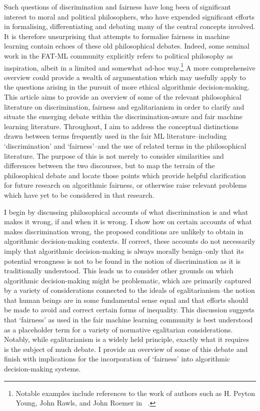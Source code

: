 \documentclass[pmlr,twocolumn,10pt]{jmlr}%
\begin{document}
Such questions of discrimination and fairness have long been of significant interest to moral and political philosophers, who have expended significant efforts in formalising, differentiating and debating many of the central concepts involved. It is therefore unsurprising that attempts to formalise fairness in machine learning contain echoes of these old philosophical debates. Indeed, some seminal work in the FAT-ML community explicitly refers to political philosophy as inspiration, albeit in a limited and somewhat ad-hoc way.\footnote{Notable examples include references to the work of authors such as H. Peyton Young, John Rawls, and John Roemer in ~\cite{dwork2012fairness,joseph2016rawlsian}.} A more comprehensive overview could provide a wealth of argumentation which may usefully apply to the questions arising in the pursuit of more ethical algorithmic decision-making. This article aims to provide an overview of some of the relevant philosophical literature on discrimination, fairness and egalitarianism in order to clarify and situate the emerging debate within the discrimination-aware and fair machine learning literature. Throughout, I aim to address the conceptual distinctions drawn between terms frequently used in the fair ML literature--including `discrimination' and `fairness'--and the use of related terms in the philosophical literature. The purpose of this is not merely to consider similarities and differences between the two discourses, but to map the terrain of the philosophical debate and locate those points which provide helpful clarification for future research on algorithmic fairness, or otherwise raise relevant problems which have yet to be considered in that research.

I begin by discussing philosophical accounts of what discrimination is and what makes it wrong, if and when it is wrong. I show how on certain accounts of what makes discrimination wrong, the proposed conditions are unlikely to obtain in algorithmic decision-making contexts. If correct, these accounts do not necessarily imply that algorithmic decision-making is always morally benign--only that its potential wrongness is not to be found in the notion of discrimination as it is traditionally understood. This leads us to consider other grounds on which algorithmic decision-making might be problematic, which are primarily captured by a variety of considerations connected to the ideals of egalitarianism--the notion that human beings are in some fundamental sense equal and that efforts should be made to avoid and correct certain forms of inequality. This discussion suggests that `fairness' as used in the fair machine learning community is best understood as a placeholder term for a variety of normative egalitarian considerations. Notably, while egalitarianism is a widely held principle, exactly what it requires is the subject of much debate. I provide an overview of some of this debate and finish with implications for the incorporation of `fairness' into algorithmic decision-making systems.
\end{document}
